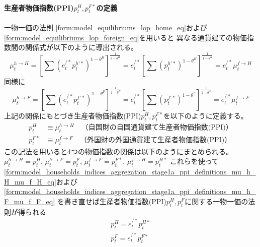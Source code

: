 \paragraph{生産者物価指数(PPI)\(p_t^H, p_t^{F*}\)の定義}
\label{sec:model_households_indices_aggregation_stage1a_ppi_definitions}
一物一価の法則
\eqref{form:model_equilibriums_lop_home_eq}および
\eqref{form:model_equilibriums_lop_foreign_eq}を用いると
異なる通貨建ての物価指数間の関係式が以下のように導出される。
\begin{equation}
\label{form:model_households_indices_aggregation_stage1a_ppi_definitions_mu_h_H_mu_f_H_eq}
    \mu_t^{h\to H}
    =\left[\sum(e_t^{/*}p_t^{h'*})^{1-\theta^H}\right]^{\frac{1}{1-\theta^H}}
    =e_t^{/*}\left[\sum(p_t^{h'*})^{1-\theta^H}\right]^{\frac{1}{1-\theta^H}}
    =e_t^{/*}\mu_t^{f\to H}
\end{equation}
同様に
\begin{equation}
\label{form:model_households_indices_aggregation_stage1a_ppi_definitions_mu_h_F_mu_f_F_eq}
    \mu_t^{h\to F}
    =\left[\sum(e_t^{/*}p_t^{f'*})^{1-\theta^F}\right]^{\frac{1}{1-\theta^F}}
    =e_t^{/*}\left[\sum(p_t^{f'*})^{1-\theta^F}\right]^{\frac{1}{1-\theta^F}}
    =e_t^{/*}\mu_t^{f\to F}
\end{equation}
上記の関係にもとづき生産者物価指数(PPI)\(p_t^H, p_t^{F*}\)を以下のように定義する。
\begin{align}
    \label{form:model_households_indices_aggregation_stage1a_ppi_definitions_p_H_def}
        p_t^H&\equiv\mu_t^{h\to H}\quad\text{（自国財の自国通貨建て生産者物価指数(PPI)）} \\
    \label{form:model_households_indices_aggregation_stage1a_ppi_definitions_p_F_star_def}
        p_t^{F*}&\equiv\mu_t^{f\to F}\quad\text{（外国財の外国通貨建て生産者物価指数(PPI)）}
\end{align}
この記法を用いると4つの物価指数の関係は以下のようにまとめられる。
\(\mu_t^{h\to H}=p_t^H\),
\(\mu_t^{h\to F}=p_t^F\),
\(\mu_t^{f\to F}=p_t^{F*}\),
\(\mu_t^{f\to H}=p_t^{H*}\)
これらを使って
\eqref{form:model_households_indices_aggregation_stage1a_ppi_definitions_mu_h_H_mu_f_H_eq}および
\eqref{form:model_households_indices_aggregation_stage1a_ppi_definitions_mu_h_F_mu_f_F_eq}
を書き直せば生産者物価指数(PPI)\(p_t^H, p_t^F\)に関する一物一価の法則が得られる
\begin{align}
    \label{form:model_households_indices_aggregation_stage1a_ppi_definitions_p_H_lop}
        p_t^H=e_t^{/*}p_t^{H*}\\
    \label{form:model_households_indices_aggregation_stage1a_ppi_definitions_p_F_lop}
        p_t^F=e_t^{/*}p_t^{F*}
\end{align}
